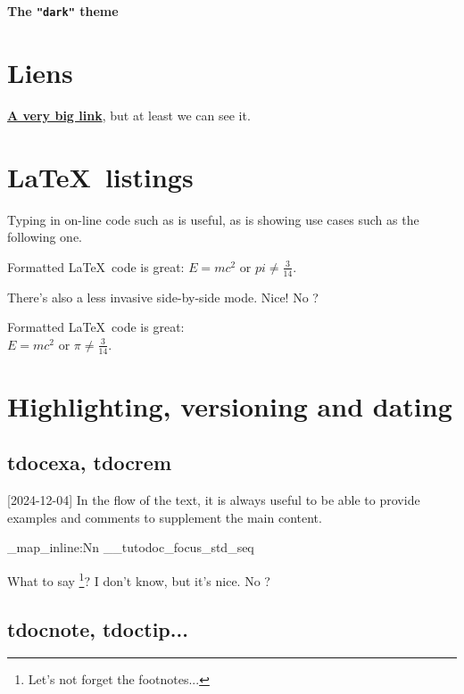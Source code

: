 \documentclass[theme = dark]{tutodoc}
\newcommand\thisstyle{dark}
\newcommand\myexrmktext{
    \tdocversion{1.7.0}[2024-12-04]
    In the flow of the text, it is always useful to be able to provide examples and comments to supplement the main content.
}
\newcommand\myhighlightedtext{
    What to say
    \footnote{
        Let's not forget the footnotes...
    }?
    I don't know, but it's nice. No ?
}
\begin{document}
\textsf{\Huge\bfseries The \texttt{"\thisstyle"} theme}

\section{Liens}

{\Large\bfseries \href{https://github.com/bc-tools/for-latex/tree/main/tutodoc}{A very big link}}, but at least we can see it.



\section{\LaTeX\ listings}

Typing in on-line code such as  is useful, as is showing use cases such as the following one.

\begin{tdoclatex}
Formatted \LaTeX\ code is great: $E = m c^2$ or $pi \neq \frac{3}{14}$.
\end{tdoclatex}


There's also a less invasive side-by-side mode. Nice! No ?

\begin{tdoclatex}[sbs]
Formatted \LaTeX\ code is great:       \\
$E = m c^2$ or $\pi \neq \frac{3}{14}$.
\end{tdoclatex}



\section{Highlighting, versioning and dating}

\subsection{tdocexa, tdocrem}

\myexrmktext

\ExplSyntaxOn

\seq_map_inline:Nn \g__tutodoc_focus_std_seq {
    \begin{tdoc#1}
        \myhighlightedtext
    \end{tdoc#1}
}

\ExplSyntaxOff



\subsection{tdocnote, tdoctip...}
\end{document}
